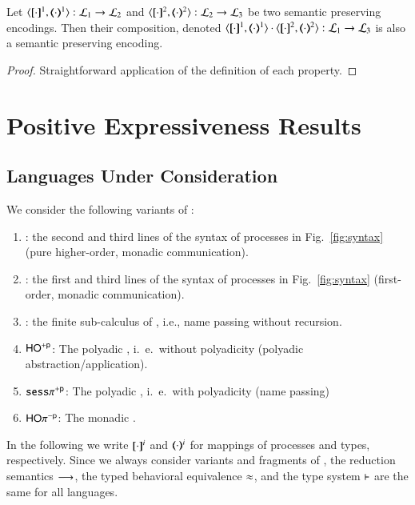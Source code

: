 \begin{proposition}
	Let $\encod{\cdot}{\cdot}{1}: \tyl{L}_1 \to \tyl{L}_2$ and $\encod{\cdot}{\cdot}{2}: \tyl{L}_2 \to \tyl{L}_3$
	be two semantic preserving encodings.
	Then their composition, denoted 
	$\encod{\cdot}{\cdot}{1} \cdot \encod{\cdot}{\cdot}{2}: \tyl{L}_1 \to \tyl{L}_3$
	is also a semantic preserving encoding.
\end{proposition}

\begin{proof}
	Straightforward application of the definition of each property.
\end{proof}

\section{Positive Expressiveness Results}

\subsection{Languages Under Consideration}
We consider the following variants of \HOp:
\begin{enumerate}[-]
	\item	\HO: the second and third lines of the syntax of processes in Fig.~\ref{fig:syntax} (pure higher-order, monadic communication).
	\item	\sesp: the first and third lines of the syntax of processes in Fig.~\ref{fig:syntax} (first-order, monadic communication).
	\item	\sespnr: the finite sub-calculus of \sesp, i.e., name passing without recursion.
	\item	$\mathsf{HO}^{+\mathsf{p}}$: The polyadic \HO, i.~e.\ without polyadicity (polyadic abstraction/application).
	\item	$\mathtt{sess}\pi^{+\mathsf{p}}$: The polyadic \sesp, i.~e.\ with polyadicity (name passing)
	\item	$\mathsf{HO}\pi^{-\mathsf{p}}$: The monadic \HOp.
\end{enumerate}
\noindent
In the following we write $[\!\![\cdot]\!\!]^i$
and $(\!\!\langle\cdot\rangle\!\!)^i$ 
for mappings of processes and types, respectively.
Since we always consider variants and fragments of \HOp, the 
reduction semantics $\longrightarrow$, the typed behavioral equivalence $\approx$,
and the type system $\vdash$ are the same for all languages.

